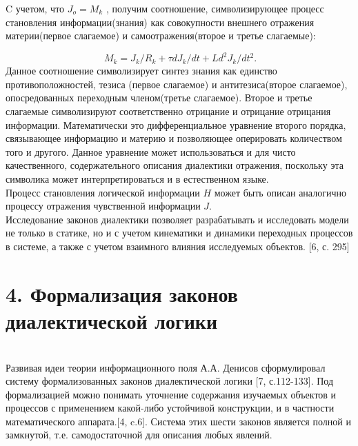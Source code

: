\documentclass[a4paper,12pt]{report}
\begin{document}
C учетом, что $J_o = M_k$ , получим соотношение, символизирующее процесс становления информации(знания) как совокупности внешнего отражения материи(первое слагаемое) и самоотражения(второе и третье слагаемые):

\begin{equation}
\label{trivial}
 \ M_k = J_k/R_k + \tau dJ_k/dt + Ld^2J_k/dt^2.
\end{equation} 
 Данное соотношение символизирует синтез знания как единство противоположностей, тезиса (первое слагаемое) и антитезиса(второе слагаемое), опосредованных переходным членом(третье слагаемое). Второе и третье слагаемые символизируют соответственно отрицание и отрицание отрицания информации. Математически это дифференциальное уравнение второго порядка, связывающее информацию и материю и позволяющее оперировать количеством того и другого. Данное уравнение может использоваться и для чисто качественного, содержательного описания диалектики отражения, поскольку эта символика может интерпретироваться и в естественном языке.\\
 Процесс становления логической информации $H$ может быть описан аналогично процессу отражения чувственной информации $J$. \\
 Исследование законов диалектики позволяет разрабатывать и исследовать модели не только в статике, но и с учетом кинематики и динамики переходных процессов в системе, а также с учетом взаимного влияния исследуемых объектов. [6, с. 295]
 
 \chapter*{4. Формализация законов диалектической логики}
  \\
 
	Развивая идеи теории информационного поля А.А. Денисов сформулировал систему формализованных законов диалектической логики [7, с.112-133]. Под формализацией можно понимать уточнение содержания изучаемых объектов и процессов с применением какой-либо устойчивой конструкции, и в частности математического аппарата.[4, c.6]. Система этих шести законов является полной и замкнутой, т.е. самодостаточной для описания любых явлений.
\end{document}
